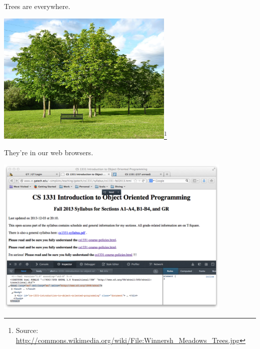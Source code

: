\documentclass{beamer}
\begin{document}
\begin{frame}
  \titlepage
\end{frame}

\begin{frame}[fragile]{}

Trees are everywhere.

\begin{center}
\includegraphics[height=2.5in]{1024px-Winnersh_Meadows_Trees.jpg}\footnote{Source:\url{ http://commons.wikimedia.org/wiki/File:Winnersh_Meadows_Trees.jpg}}
\end{center}

\end{frame}

\begin{frame}[fragile]{}

They're in our web browsers.

\begin{center}
\includegraphics[height=3in]{xhtml-tree.png}
\end{center}

\end{frame}
\end{document}
